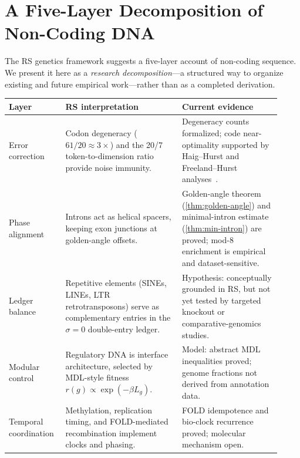 \documentclass[11pt,a4paper]{article}
\begin{document}
\section{A Five-Layer Decomposition of Non-Coding DNA}
\label{sec:layers}

The RS genetics framework suggests a five-layer account of non-coding sequence. We present it here as a \emph{research decomposition}---a structured way to organize existing and future empirical work---rather than as a completed derivation.

\begin{center}
\small
\renewcommand{\arraystretch}{1.3}
\begin{tabular}{@{}p{0.18\linewidth}p{0.40\linewidth}p{0.34\linewidth}@{}}
\toprule
\textbf{Layer} & \textbf{RS interpretation} & \textbf{Current evidence} \\
\midrule
Error correction & Codon degeneracy ($61/20 \approx 3\times$) and the 20/7 token-to-dimension ratio provide noise immunity. & Degeneracy counts formalized; code near-optimality supported by Haig--Hurst and Freeland--Hurst analyses~\cite{HaigHurst1991, FreelandHurst1998}. \\

Phase alignment & Introns act as helical spacers, keeping exon junctions at golden-angle offsets. & Golden-angle theorem (\cref{thm:golden-angle}) and minimal-intron estimate (\cref{thm:min-intron}) are proved; mod-8 enrichment is empirical and dataset-sensitive. \\

Ledger balance & Repetitive elements (SINEs, LINEs, LTR retrotransposons) serve as complementary entries in the $\sigma{=}0$ double-entry ledger. & Hypothesis: conceptually grounded in RS, but not yet tested by targeted knockout or comparative-genomics studies. \\

Modular control & Regulatory DNA is interface architecture, selected by MDL-style fitness $r(g) \propto \exp(-\beta L_g)$. & Model: abstract MDL inequalities proved; genome fractions not derived from annotation data. \\

Temporal coordination & Methylation, replication timing, and FOLD-mediated recombination implement clocks and phasing. & FOLD idempotence and bio-clock recurrence proved; molecular mechanism open. \\
\bottomrule
\end{tabular}
\end{center}
\end{document}
